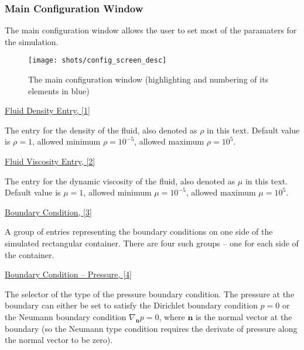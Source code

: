 \documentclass{article}
\newcommand{\vxlisp}{\vspace*{12pt}}
\begin{document}
\subsubsection{Main Configuration Window}
The main configuration window allows the user to set most of the paramaters for the simulation.

\newcommand{\shotscale}{.4}
\begin{figure}[h]
	\texttt{[image: shots/config\_screen\_desc]}
	\caption{The main configuration window (highlighting and numbering of its elements in blue)}
\end{figure}
\newcommand{\numrho}{1}
\newcommand{\nummu}{2}
\newcommand{\numbc}{3}
\newcommand{\numpbc}{4}
\newcommand{\numvx}{5}
\newcommand{\numvy}{6}
\newcommand{\numwp}{7}
\newcommand{\numhp}{8}
\newcommand{\numdt}{9}
\newcommand{\numsteps}{10}
\newcommand{\numcap}{11}
\newcommand{\numbackhome}{12}
\newcommand{\numeditor}{13}
\newcommand{\numpreset}{14}
\newcommand{\numstart}{15}

\newcommand{\undrsep}{\vspace*{2pt}}

\underline{Fluid Density Entry, [\numrho]}
\undrsep

The entry for the density of the fluid, also denoted as $\rho$ in this text. Default value is $\rho=1$, allowed minimum $\rho=10^{-5}$, allowed maximum $\rho=10^{5}$.
\vxlisp

\underline{Fluid Viscosity Entry, [\nummu]}
\undrsep

The entry for the dynamic viscosity of the fluid, also denoted as $\mu$ in this text. Default value is $\mu=1$, allowed minimum $\mu=10^{-5}$, allowed maximum $\mu=10^5$.
\vxlisp

\underline{Boundary Condition, [\numbc]}
\undrsep

A group of entries representing the boundary conditions on one side of the simulated rectangular container. There are four such groups -- one for each side of the container.
\vxlisp

\underline{Boundary Condition -- Pressure, [\numpbc]}
\undrsep

The selector of the type of the pressure boundary condition. The pressure at the boundary can either be set to satisfy the Dirichlet boundary condition $p=0$ or the Neumann boundary condition $\nabla_{\mathbf n}p=0$, where $\mathbf n$ is the normal vector at the boundary (so the Neumann type condition requires the derivate of pressure along the normal vector to be zero).
\vxlisp
\end{document}
